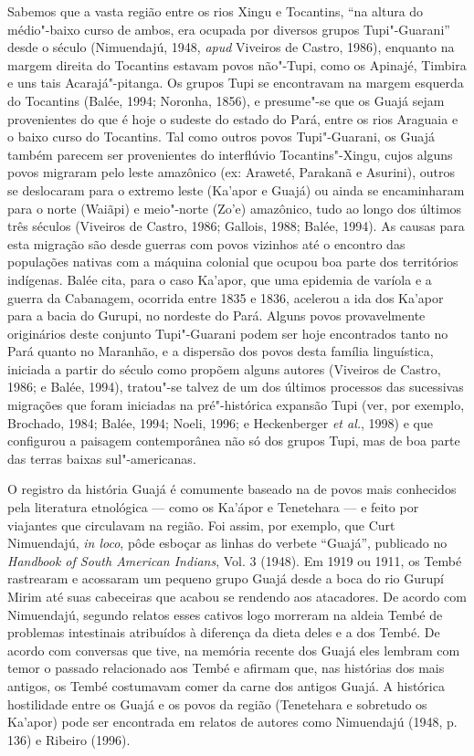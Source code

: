 Sabemos que a vasta região entre os rios Xingu e Tocantins, ``na altura
do médio"-baixo curso de ambos, era ocupada por diversos grupos
Tupi"-Guarani'' desde o século  (Nimuendajú, 1948, \emph{apud} Viveiros de
Castro, 1986), enquanto na margem direita do Tocantins estavam povos
não"-Tupi, como os Apinajé, Timbira e uns tais Acarajá"-pitanga. Os grupos
Tupi se encontravam na margem esquerda do Tocantins (Balée, 1994;
Noronha, 1856), e presume"-se que os Guajá sejam provenientes do que é
hoje o sudeste do estado do Pará, entre os rios Araguaia e o baixo curso
do Tocantins. Tal como outros povos Tupi"-Guarani, os Guajá também
parecem ser provenientes do interflúvio Tocantins"-Xingu, cujos alguns
povos migraram pelo leste amazônico (ex: Araweté, Parakanã e Asurini),
outros se deslocaram para o extremo leste (Ka'apor e Guajá) ou ainda se
encaminharam para o norte (Waiãpi) e meio"-norte (Zo'e) amazônico, tudo
ao longo dos últimos três séculos (Viveiros de Castro, 1986; Gallois,
1988; Balée, 1994). As causas para esta migração são desde guerras com
povos vizinhos até o encontro das populações nativas com a máquina
colonial que ocupou boa parte dos territórios indígenas. Balée cita,
para o caso Ka'apor, que uma epidemia de varíola e a guerra da
Cabanagem, ocorrida entre 1835 e 1836, acelerou a ida dos Ka'apor para a
bacia do Gurupi, no nordeste do Pará. Alguns povos provavelmente
originários deste conjunto Tupi"-Guarani podem ser hoje encontrados tanto
no Pará quanto no Maranhão, e a dispersão dos povos desta família
linguística, iniciada a partir do século  como propõem alguns
autores (Viveiros de Castro, 1986; e Balée, 1994), tratou"-se talvez de
um dos últimos processos das sucessivas migrações que foram iniciadas na
pré"-histórica expansão Tupi (ver, por exemplo, Brochado, 1984; Balée,
1994; Noeli, 1996; e Heckenberger \emph{et al.}, 1998) e que configurou a
paisagem contemporânea não só dos grupos Tupi, mas de boa parte das
terras baixas sul"-americanas.

O registro da história Guajá é comumente baseado na de povos mais
conhecidos pela literatura etnológica --- como os Ka'ápor e Tenetehara ---
e feito por viajantes que circulavam na região. Foi assim, por exemplo,
que Curt Nimuendajú, \emph{in loco}, pôde esboçar as linhas do verbete
``Guajá'', publicado no \emph{Handbook of South American Indians}, Vol. 3
(1948). Em 1919 ou 1911, os Tembé rastrearam e acossaram um pequeno
grupo Guajá desde a boca do rio Gurupí Mirim até suas cabeceiras que
acabou se rendendo aos atacadores. De acordo com Nimuendajú, segundo
relatos esses cativos logo morreram na aldeia Tembé de problemas
intestinais atribuídos à diferença da dieta deles e a dos Tembé. De
acordo com conversas que tive, na memória recente dos Guajá eles lembram
com temor o passado relacionado aos Tembé e afirmam que, nas histórias
dos mais antigos, os Tembé costumavam comer da carne dos antigos Guajá.
A histórica hostilidade entre os Guajá e os povos da região (Tenetehara
e sobretudo os Ka'apor) pode ser encontrada em relatos de autores como
Nimuendajú (1948, p. 136) e Ribeiro (1996).

